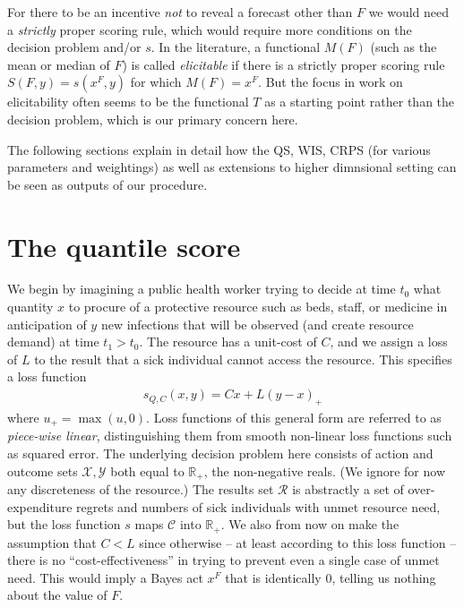 \documentclass{article}
\begin{document}
\begin{remark} For there to be an incentive \emph{not} to reveal a forecast other than $F$ we would need a \emph{strictly} proper scoring rule, which would require more conditions on the decision problem and/or $s$. In the literature, a functional $M(F)$ (such as the mean or median of $F$) is called \emph{elicitable} if there is a strictly proper scoring rule $S(F,y) = s(x^F,y)$ for which $M(F)=x^F$.  But the focus in work on elicitability often seems to be the functional $T$ as a starting point rather than the decision problem, which is our primary concern here.
\end{remark}

The following sections explain in detail how the QS, WIS, CRPS (for various parameters and weightings) as well as extensions to higher dimnsional setting can be seen as outputs of our procedure. 

\section{The quantile score}

We begin by imagining a public health worker trying to decide at time $t_0$ what quantity $x$ to procure of a protective resource such as beds, staff, or medicine in anticipation of $y$ new infections that will be observed (and create resource demand) at time $t_1>t_0$. The resource has a unit-cost of $C$, and we assign a loss of $L$ to the result that a sick individual cannot access the resource. This specifies a loss function  
\begin{align}
s_{Q,C}(x,y) = Cx + L(y-x)_+ \label{eqn:quantile_loss}
\end{align}
where $u_+ = \max(u,0)$.  Loss functions of this general form are referred to as \emph{piece-wise linear}, distinguishing them from smooth non-linear loss functions such as squared error.
The underlying decision problem here consists of action and outcome sets $\mathcal{X},\mathcal{Y}$ both equal to $\mathbb{R}_+$, the non-negative reals.  (We ignore for now any discreteness of the resource.) The results set $\mathcal{R}$ is abstractly a set of over-expenditure regrets and numbers of sick individuals with unmet resource need, but the loss function $s$ maps $\mathcal{C}$ into $\mathbb{R}_+$. We also from now on make the assumption that $C < L$ since otherwise -- at least according to this loss function -- there is no ``cost-effectiveness'' in trying to prevent even a single case of unmet need. This would imply a Bayes act $x^F$ that is identically 0, telling us nothing about the value of $F$.
\end{document}
